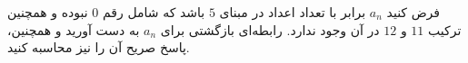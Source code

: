 \EXERCISE
فرض کنید 
$a_n$
 برابر با تعداد اعداد در مبنای 
$5$
  باشد که شامل رقم 
$0$
   نبوده و همچنین ترکیب 
$11$
    و 
$12$
    در آن وجود ندارد. رابطه‌ای بازگشتی برای 
$a_n$
     به دست آورید و همچنین، پاسخ صریح آن را نیز محاسبه کنید.